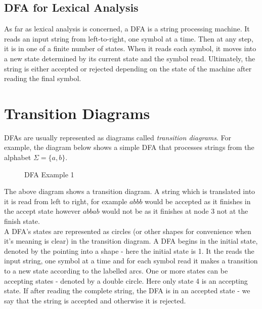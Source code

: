 \subsection{DFA for Lexical Analysis}
As far as lexical analysis is concerned, a DFA is a string processing machine. It reads an input string from left-to-right, one symbol at a time. Then at any step, it is in one of a finite number of states. When it reads each symbol, it moves into a new state determined by its current state and the symbol read. Ultimately, the string is either accepted or rejected depending on the state of the machine after reading the final symbol. 

\section{Transition Diagrams}
DFAs are usually represented as diagrams called \textit{transition diagrams}. For example, the diagram below shows a simple DFA that processes strings from the alphabet $\Sigma = \{a, b\}$.
\begin{figure}[H]
    \centering
    \caption{DFA Example 1}
    \label{fig:dfa-string}
\end{figure}

The above diagram shows a transition diagram. A string which is translated into it is read from left to right, for example $abbb$ would be accepted as it finishes in the accept state however $abbab$ would not be as it finishes at node 3 not at the finish state.\\

A DFA's states are represented as circles (or other shapes for convenience when it's meaning is clear) in the transition diagram. A DFA begins in the initial state, denoted by the pointing into a shape - here the initial state is 1. It the reads the input string, one symbol at a time and for each symbol read it makes a transition to a new state according to the labelled arcs. One or more states can be accepting states - denoted by a double circle. Here only state 4 is an accepting state. If after reading the complete string, the DFA is in an accepted state - we say that the string is accepted and otherwise it is rejected.\\

